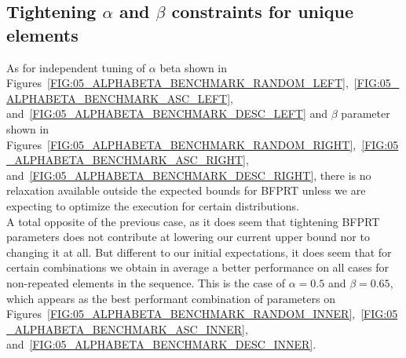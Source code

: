 \subsection{Tightening $\alpha$ and $\beta$ constraints for unique elements}

As for independent tuning of $\alpha$ beta shown in Figures~\ref{FIG:05_ALPHABETA_BENCHMARK_RANDOM_LEFT},~\ref{FIG:05_ALPHABETA_BENCHMARK_ASC_LEFT}, and~\ref{FIG:05_ALPHABETA_BENCHMARK_DESC_LEFT} and $\beta$ parameter shown in Figures~\ref{FIG:05_ALPHABETA_BENCHMARK_RANDOM_RIGHT},~\ref{FIG:05_ALPHABETA_BENCHMARK_ASC_RIGHT}, and~\ref{FIG:05_ALPHABETA_BENCHMARK_DESC_RIGHT}, there is no relaxation available outside the expected bounds for BFPRT unless we are expecting to optimize the execution for certain distributions.\\

A total opposite of the previous case, as it does seem that tightening BFPRT parameters does not contribute at lowering our current upper bound nor to changing it at all. But different to our initial expectations, it does seem that for certain combinations we obtain in average a better performance on all cases for non-repeated elements in the sequence. This is the case of $\alpha=0.5$ and $\beta=0.65$, which appears as the best performant combination of parameters on Figures~\ref{FIG:05_ALPHABETA_BENCHMARK_RANDOM_INNER},~\ref{FIG:05_ALPHABETA_BENCHMARK_ASC_INNER}, and~\ref{FIG:05_ALPHABETA_BENCHMARK_DESC_INNER}. \\



